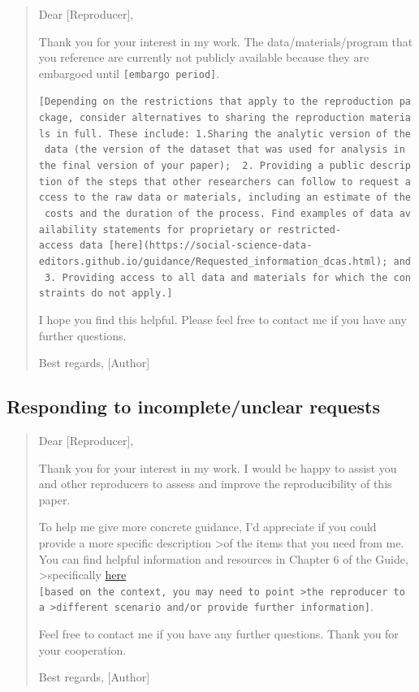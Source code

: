 \documentclass[
  openany]{book}
\begin{document}
\begin{quote}
Dear {[}Reproducer{]},

Thank you for your interest in my work. The data/materials/program that you reference are currently not publicly available because they are embargoed until \texttt{{[}embargo\ period{]}}.

\texttt{{[}Depending\ on\ the\ restrictions\ that\ apply\ to\ the\ reproduction\ package,\ consider\ alternatives\ to\ sharing\ the\ reproduction\ materials\ in\ full.\ These\ include:\ 1.Sharing\ the\ analytic\ version\ of\ the\ data\ (the\ version\ of\ the\ dataset\ that\ was\ used\ for\ analysis\ in\ the\ final\ version\ of\ your\ paper);\ \ 2.\ Providing\ a\ public\ description\ of\ the\ steps\ that\ other\ researchers\ can\ follow\ to\ request\ access\ to\ the\ raw\ data\ or\ materials,\ including\ an\ estimate\ of\ the\ costs\ and\ the\ duration\ of\ the\ process.\ Find\ examples\ of\ data\ availability\ statements\ for\ proprietary\ or\ restricted-access\ data\ {[}here{]}(https://social-science-data-editors.github.io/guidance/Requested\_information\_dcas.html);\ and\ 3.\ Providing\ access\ to\ all\ data\ and\ materials\ for\ which\ the\ constraints\ do\ not\ apply.{]}}

I hope you find this helpful. Please feel free to contact me if you have any further questions.

Best regards,
{[}Author{]}
\end{quote}

\hypertarget{responding-to-incompleteunclear-requests}{%
\subsection{Responding to incomplete/unclear requests}\label{responding-to-incompleteunclear-requests}}

\begin{quote}
Dear {[}Reproducer{]},

Thank you for your interest in my work. I would be happy to assist you and other reproducers to assess and improve the reproducibility of this paper.

To help me give more concrete guidance, I'd appreciate if you could provide a more specific description \textgreater of the items that you need from me. You can find helpful information and resources in Chapter 6 of the Guide, \textgreater specifically \href{https://bitss.github.io/ACRE/guidance-for-a-constructive-exchange-between-reproducers-and-original-authors.html\#asking-for-additional-guidance-when-some-materials-have-been-shared}{here} \texttt{{[}based\ on\ the\ context,\ you\ may\ need\ to\ point\ \textgreater{}the\ reproducer\ to\ a\ \textgreater{}different\ scenario\ and/or\ provide\ further\ information{]}}.

Feel free to contact me if you have any further questions. Thank you for your cooperation.

Best regards,
{[}Author{]}
\end{quote}
\end{document}
